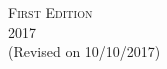 \begin{center}
  \begin{minipage}{0.8\textwidth}
    \centering
    \small


    \begin{minipage}[t]{0.4\textwidth}
    \begin{center}
      \textsc{First Edition} \\
      2017\\
      (Revised on 10/10/2017) \\
      \end{center}
    \end{minipage}
    \hfill
  \end{minipage}

\end{center}
